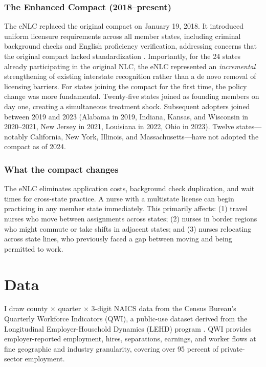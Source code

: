 \documentclass[12pt]{article}
\begin{document}
\subsubsection*{The Enhanced Compact (2018--present)} The eNLC replaced the original compact on January 19, 2018. It introduced uniform licensure requirements across all member states, including criminal background checks and English proficiency verification, addressing concerns that the original compact lacked standardization \citep{ncsbn2018enlc}. Importantly, for the 24 states already participating in the original NLC, the eNLC represented an \emph{incremental} strengthening of existing interstate recognition rather than a de novo removal of licensing barriers. For states joining the compact for the first time, the policy change was more fundamental. Twenty-five states joined as founding members on day one, creating a simultaneous treatment shock. Subsequent adopters joined between 2019 and 2023 (Alabama in 2019, Indiana, Kansas, and Wisconsin in 2020--2021, New Jersey in 2021, Louisiana in 2022, Ohio in 2023). Twelve states---notably California, New York, Illinois, and Massachusetts---have not adopted the compact as of 2024.

\subsubsection*{What the compact changes} The eNLC eliminates application costs, background check duplication, and wait times for cross-state practice. A nurse with a multistate license can begin practicing in any member state immediately. This primarily affects: (1) travel nurses who move between assignments across states; (2) nurses in border regions who might commute or take shifts in adjacent states; and (3) nurses relocating across state lines, who previously faced a gap between moving and being permitted to work.


\section{Data}

I draw county $\times$ quarter $\times$ 3-digit NAICS data from the Census Bureau's Quarterly Workforce Indicators (QWI), a public-use dataset derived from the Longitudinal Employer-Household Dynamics (LEHD) program \citep{hyatt2014job}. QWI provides employer-reported employment, hires, separations, earnings, and worker flows at fine geographic and industry granularity, covering over 95 percent of private-sector employment.
\end{document}
